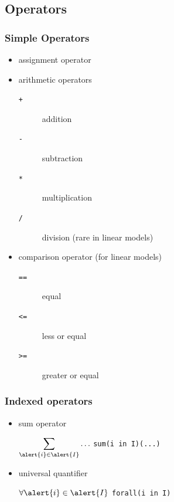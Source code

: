 \subsection{Operators}
\begin{frame}
 \frametitle{Simple Operators}
 \begin{itemize}
  \item assignment operator \structure{\texttt{=}}
  \item arithmetic operators
  \begin{description}
   \item[\texttt{+}] addition
   \item[\texttt{-}] subtraction
   \item[\texttt{*}] multiplication
   \item[\texttt{/}] division (rare in linear models)
  \end{description}
  \item comparison operator (for linear models)
  \begin{description}
   \item[\texttt{==}] equal
   \item[\texttt{<=}] less or equal
   \item[\texttt{>=}] greater or equal
  \end{description}
 \end{itemize}
\end{frame}

\begin{frame}
 \frametitle{Indexed operators}
 \begin{itemize}
  \item sum operator
  \begin{flushleft}\Large
   {$\displaystyle\sum_{\alert{i}\in \alert{I}}\ldots$} 
   \textrightarrow{} 
   { \texttt{sum(\alert{i} in \alert{I})(\textsf{...})}}
  \end{flushleft}
  \medskip
  \item universal quantifier
  \begin{flushleft}\Large
   {$\displaystyle\forall {\alert{i}\in \alert{I}}$} 
   \textrightarrow{} 
   { \texttt{forall(\alert{i} in \alert{I})}}
  \end{flushleft}
 \end{itemize}

\end{frame}


